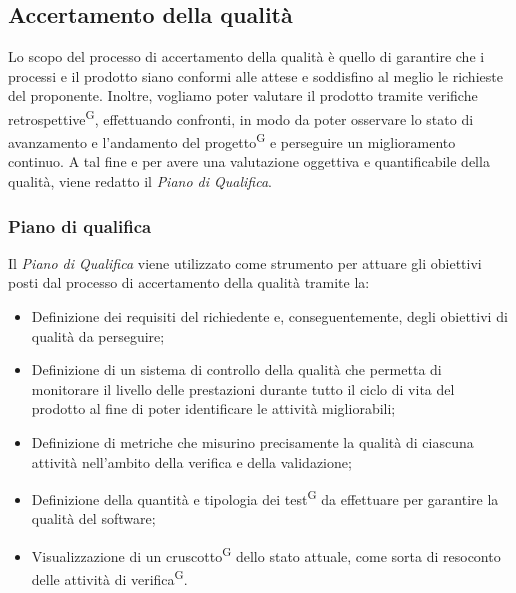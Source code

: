 \subsection{Accertamento della qualità}\label{sec:processi_di_supporto:accertamento_qualità}
Lo scopo del processo di accertamento della qualità è quello di garantire che i processi e il prodotto siano conformi alle attese e soddisfino al meglio le richieste del proponente. 
Inoltre, vogliamo poter valutare il prodotto tramite verifiche retrospettive\textsuperscript{G}, effettuando confronti, in modo da poter osservare lo stato di avanzamento e l'andamento del progetto\textsuperscript{G} e perseguire un miglioramento continuo.
A tal fine e per avere una valutazione oggettiva e quantificabile della qualità, viene redatto il \textit{Piano di Qualifica}. %

\subsubsection{Piano di qualifica}
Il \textit{Piano di Qualifica} 
viene utilizzato come strumento per attuare gli obiettivi posti dal processo di accertamento della qualità tramite la:
\begin{itemize}
    \item Definizione dei requisiti del richiedente e, conseguentemente, degli obiettivi di qualità da perseguire;
    \item Definizione di un sistema di controllo della qualità che permetta di monitorare il livello delle prestazioni durante tutto il ciclo di vita del prodotto al fine di poter identificare le attività migliorabili;
    \item Definizione di metriche che misurino precisamente la qualità di ciascuna attività nell'ambito della verifica e della validazione;
    \item Definizione della quantità e tipologia dei test\textsuperscript{G} da effettuare per garantire la qualità del software;
    \item Visualizzazione di un cruscotto\textsuperscript{G} dello stato attuale, come sorta di resoconto delle attività di verifica\textsuperscript{G}.
\end{itemize}

